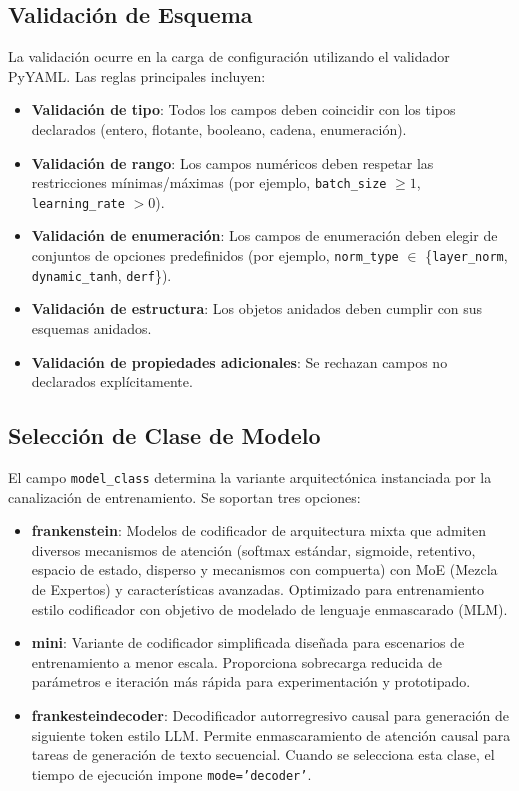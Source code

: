 \documentclass[11pt,a4paper]{article}
\begin{document}
\subsection{Validación de Esquema}
\label{sec:schema-validation}

La validación ocurre en la carga de configuración utilizando el validador PyYAML. Las reglas principales incluyen:

\begin{itemize}[leftmargin=*]
    \item \textbf{Validación de tipo}: Todos los campos deben coincidir con los tipos declarados (entero, flotante, booleano, cadena, enumeración).
    \item \textbf{Validación de rango}: Los campos numéricos deben respetar las restricciones mínimas/máximas (por ejemplo, \texttt{batch\_size} $\ge 1$, \texttt{learning\_rate} $> 0$).
    \item \textbf{Validación de enumeración}: Los campos de enumeración deben elegir de conjuntos de opciones predefinidos (por ejemplo, \texttt{norm\_type} $\in$ \{\texttt{layer\_norm}, \texttt{dynamic\_tanh}, \texttt{derf}\}).
    \item \textbf{Validación de estructura}: Los objetos anidados deben cumplir con sus esquemas anidados.
    \item \textbf{Validación de propiedades adicionales}: Se rechazan campos no declarados explícitamente.
\end{itemize}

\subsection{Selección de Clase de Modelo}

El campo \texttt{model\_class} determina la variante arquitectónica instanciada por la canalización de entrenamiento. Se soportan tres opciones:

\begin{itemize}[leftmargin=*]
    \item \textbf{frankenstein}: Modelos de codificador de arquitectura mixta que admiten diversos mecanismos de atención (softmax estándar, sigmoide, retentivo, espacio de estado, disperso y mecanismos con compuerta) con MoE (Mezcla de Expertos) y características avanzadas. Optimizado para entrenamiento estilo codificador con objetivo de modelado de lenguaje enmascarado (MLM).
    \item \textbf{mini}: Variante de codificador simplificada diseñada para escenarios de entrenamiento a menor escala. Proporciona sobrecarga reducida de parámetros e iteración más rápida para experimentación y prototipado.
    \item \textbf{frankesteindecoder}: Decodificador autorregresivo causal para generación de siguiente token estilo LLM. Permite enmascaramiento de atención causal para tareas de generación de texto secuencial. Cuando se selecciona esta clase, el tiempo de ejecución impone \texttt{mode='decoder'}.
\end{itemize}
\end{document}
